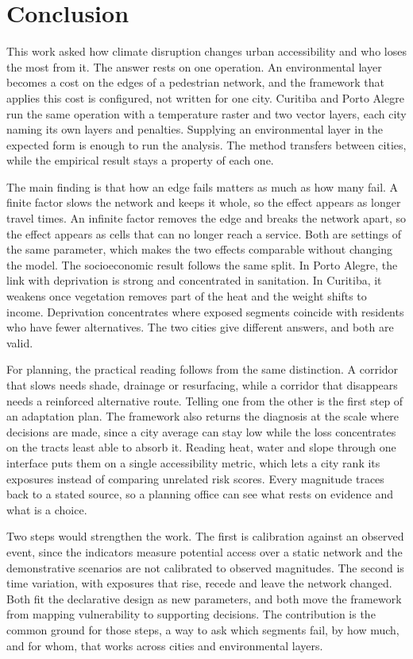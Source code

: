 \section{Conclusion}
\label{sec:conclusion}

This work asked how climate disruption changes urban accessibility and who loses the most from it. The answer rests on one operation. An environmental layer becomes a cost on the edges of a pedestrian network, and the framework that applies this cost is configured, not written for one city. Curitiba and Porto Alegre run the same operation with a temperature raster and two vector layers, each city naming its own layers and penalties. Supplying an environmental layer in the expected form is enough to run the analysis. The method transfers between cities, while the empirical result stays a property of each one.

The main finding is that how an edge fails matters as much as how many fail. A finite factor slows the network and keeps it whole, so the effect appears as longer travel times. An infinite factor removes the edge and breaks the network apart, so the effect appears as cells that can no longer reach a service. Both are settings of the same parameter, which makes the two effects comparable without changing the model. The socioeconomic result follows the same split. In Porto Alegre, the link with deprivation is strong and concentrated in sanitation. In Curitiba, it weakens once vegetation removes part of the heat and the weight shifts to income. Deprivation concentrates where exposed segments coincide with residents who have fewer alternatives. The two cities give different answers, and both are valid.

For planning, the practical reading follows from the same distinction. A corridor that slows needs shade, drainage or resurfacing, while a corridor that disappears needs a reinforced alternative route. Telling one from the other is the first step of an adaptation plan. The framework also returns the diagnosis at the scale where decisions are made, since a city average can stay low while the loss concentrates on the tracts least able to absorb it. Reading heat, water and slope through one interface puts them on a single accessibility metric, which lets a city rank its exposures instead of comparing unrelated risk scores. Every magnitude traces back to a stated source, so a planning office can see what rests on evidence and what is a choice.

Two steps would strengthen the work. The first is calibration against an observed event, since the indicators measure potential access over a static network and the demonstrative scenarios are not calibrated to observed magnitudes. The second is time variation, with exposures that rise, recede and leave the network changed. Both fit the declarative design as new parameters, and both move the framework from mapping vulnerability to supporting decisions. The contribution is the common ground for those steps, a way to ask which segments fail, by how much, and for whom, that works across cities and environmental layers.